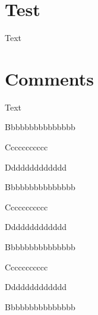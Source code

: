 \documentclass{article}
\begin{document}
%
%	
%	

\section{Test}
Text 



\section{Comments}
Text 

%	

\begin{thebibliography}{}

Bbbbbbbbbbbbbbb

Ccccccccccc

Ddddddddddddd

Bbbbbbbbbbbbbbb

Ccccccccccc

Ddddddddddddd

Bbbbbbbbbbbbbbb

Ccccccccccc

Ddddddddddddd

Bbbbbbbbbbbbbbb
%
%
%
%
%

\end{thebibliography}
\end{document}

